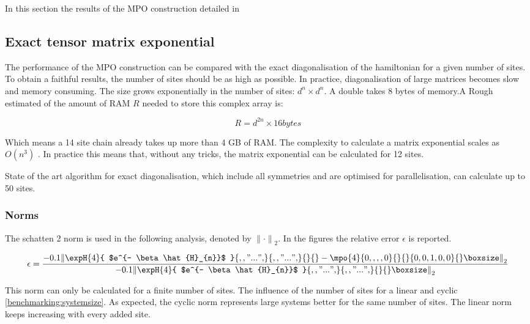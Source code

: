 In this section the results of the MPO construction detailed in

\subsection{Exact tensor matrix exponential } \label{chap_bench}

The performance of the MPO construction can be compared with the exact diagonalisation of the hamiltonian for a given number of sites. To obtain a faithful results, the number of sites should be as high as possible. In practice, diagonalisation of large matrices becomes slow and memory consuming. The size grows exponentially in the number of sites: $d^{n} \times d^{n} $. A double takes 8 bytes of memory.A Rough estimated of the amount of RAM $R$ needed to store this complex array is:

\begin{equation}
    R = d^{2 n} \times 16 bytes
\end{equation}

Which means a 14 site chain already takes up more than 4 GB of RAM. The complexity to calculate a matrix exponential scales as $O(n^3)$ \cite{Moler2003}. In practice this means that, without any tricks, the matrix exponential can be calculated for 12 sites.

State of the art algorithm for exact diagonalisation, which include all symmetries and are optimised for parallelisation, can calculate up to 50 sites. \cite{Wietek2018}

\subsubsection{Norms} \label{mponormdef}
\def \expHBlock {\expH{4}{ $e^{- \beta \hat{H}_{n}}$   }{ {,,"...",} }{ {,,"...",} }{}{} }
\def \Mn {\mpo{4}{ {0,,,,0}  }{}{}{{0,0,1,0,0}}{}}

The schatten 2 norm is used in the following analysis, denoted by ${\| \cdot \|} _{2}$. In the figures the relative error $\epsilon$ is reported.

\begin{equation}
    \epsilon = \frac{  {  \left \|  \expHBlock - \Mn  \right \|} _{2}  }{ {  \left\|  \expHBlock \right \|}_2}
\end{equation}

This norm can only be calculated for a finite number of sites. The influence of the number of sites for a linear  and cyclic \cref{benchmarking:systemsize}. As expected, the cyclic norm represents large systems better for the same number of sites. The linear norm keeps increasing with every added site.

